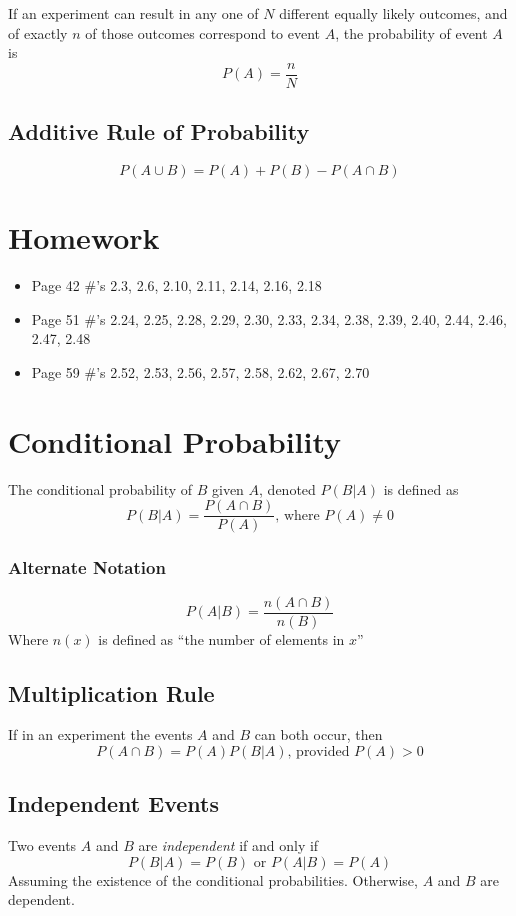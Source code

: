 \documentclass{book}
\newcommand{\note}[1]{\marginpar{\emph{Note: #1}}}
\begin{document}
If an experiment can result in any one of $N$ different equally likely outcomes, and of exactly $n$ of those outcomes correspond to event $A$, the probability of event $A$ is $$P(A) = \frac{n}{N}$$

\subsection{Additive Rule of Probability}

$$P(A \cup B) = P(A) + P(B) - P(A \cap B)$$

\section{Homework}
\label{Chapter 2 Homework}
\begin{itemize}
\item Page 42 \#'s 2.3, 2.6, 2.10, 2.11, 2.14, 2.16, 2.18
\item Page 51 \#'s 2.24, 2.25, 2.28, 2.29, 2.30, 2.33, 2.34, 2.38, 2.39, 2.40, 2.44, 2.46, 2.47, 2.48
\item Page 59 \#'s 2.52, 2.53, 2.56, 2.57, 2.58, 2.62, 2.67, 2.70
\end{itemize}

\section{Conditional Probability}

The conditional probability of $B$ given $A$, denoted $P(B|A)$ is defined as $$P(B|A) = \frac{P(A \cap B)}{P(A)} \text{, where } P(A) \ne 0 $$
\note{This is a filter}

\subsubsection{Alternate Notation}
$$P(A|B) =\frac{n(A \cap B)}{n(B)}$$
Where $n(x)$ is defined as \enquote{the number of elements in $x$} 

\subsection{Multiplication Rule}
If in an experiment the events $A$ and $B$ can both occur, then $$P(A\cap B) = P(A)P(B|A)\text{, provided } P(A) > 0$$

\subsection{Independent Events}
Two events $A$ and $B$ are \emph{independent} if and only if 
$$P(B|A) = P(B) \text{ or } P(A|B)=P(A)$$
Assuming the existence of the conditional probabilities. Otherwise, $A$ and $B$ are dependent.
\end{document}
